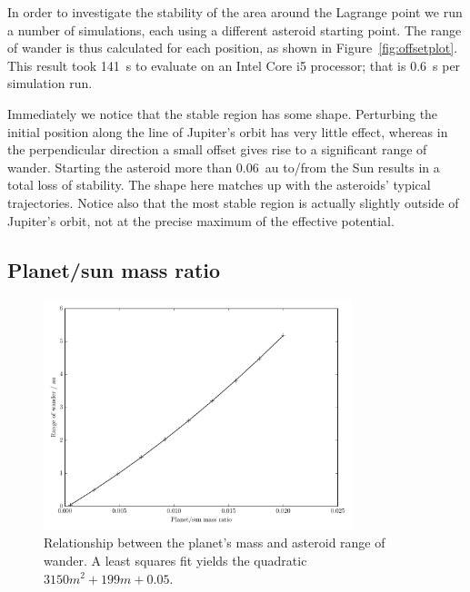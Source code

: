 \documentclass[a4paper]{article}
\newcommand{\liningnums}[1]{{\fontfamily{pplx}\selectfont #1}}
\begin{document}
      In order to investigate the stability of the area around the Lagrange
      point we run a number of simulations, each using a different asteroid
      starting point. The range of wander is thus calculated for each position,
      as shown in Figure~\ref{fig:offsetplot}. This result took
      \SI{141}{\second} to evaluate on an Intel Core \liningnums{i5} processor;
      that is \SI{0.6}{\second} per simulation run.

      Immediately we notice that the stable region has some shape. Perturbing
      the initial position along the line of Jupiter's orbit has very little
      effect, whereas in the perpendicular direction a small offset gives rise
      to a significant range of wander. Starting the asteroid more than
      \SI{0.06}{\astronomicalunit} to/from the Sun results in a total loss of
      stability. The shape here matches up with the asteroids' typical
      trajectories.  Notice also that the most stable region is actually
      slightly outside of Jupiter's orbit, not at the precise maximum of the
      effective potential.

    \subsection{Planet/sun mass ratio}
      \label{sec:massratio}

      \begin{figure}
        \centering
        \caption{Relationship between the planet's mass and 
        asteroid range of wander. A least squares fit yields the quadratic
        $3150 m^2 + 199 m + 0.05$.}
        \label{fig:mass}
        \includegraphics[width=0.8\textwidth]{figures/mass}
      \end{figure}
\end{document}
